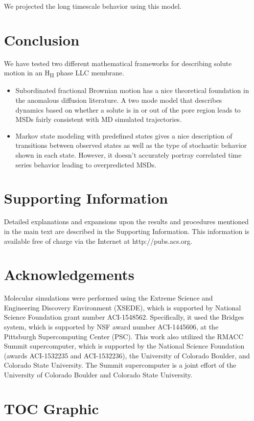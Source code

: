 \documentclass{article}
\begin{document}
  We projected the long timescale behavior using this model. 

  \section{Conclusion}

  
  We have tested two different mathematical frameworks for describing solute
  motion in an H\textsubscript{II} phase LLC membrane.
  \begin{itemize}
    \item Subordinated fractional Brownian motion has a nice theoretical foundation
    in the anomalous diffusion literature. A two mode model that describes dynamics
    based on whether a solute is in or out of the pore region leads to MSDs fairly
    consistent with MD simulated trajectories.
    \item Markov state modeling with predefined states gives a nice description
    of transitions between observed states as well as the type of stochastic 
    behavior shown in each state. However, it doesn't accurately portray correlated
    time series behavior leading to overpredicted MSDs.
  \end{itemize}
  
  
 
  \section*{Supporting Information}

  Detailed explanations and expansions upon the results and procedures mentioned in
  the main text are described in the Supporting Information. This information is
  available free of charge via the Internet at http://pubs.acs.org.

  \section*{Acknowledgements}

  Molecular simulations were performed using the Extreme Science and
  Engineering Discovery Environment (XSEDE), which is supported by National
  Science Foundation grant number ACI-1548562. Specifically, it used the Bridges
  system, which is supported by NSF award number ACI-1445606, at the Pittsburgh
  Supercomputing Center (PSC). This work also utilized the RMACC Summit supercomputer,
  which is supported by the National Science Foundation (awards ACI-1532235 and
  ACI-1532236), the University of Colorado Boulder, and Colorado State
  University. The Summit supercomputer is a joint effort of the University of
  Colorado Boulder and Colorado State University.

  \clearpage

  
  

  \newpage

  \section*{TOC Graphic}
\end{document}
